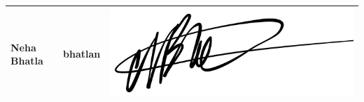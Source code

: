 \documentclass{article}
\begin{document}
\begin{center}
\begin{tabular}{|m{4cm}|m{4cm}|m{6cm}|}
		\hline
		Neha Bhatla & bhatlan & \includegraphics[scale=0.05]{neha_signature.jpeg}\\ 
		\hline
	\end{tabular}
\end{center}
\end{document}
